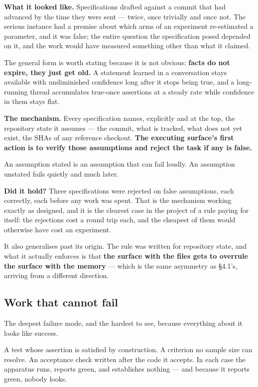 \textbf{What it looked like.} Specifications drafted against a commit that had advanced by the time they were sent --- twice, once trivially and once not. The serious instance had a premise about which arms of an experiment re-estimated a parameter, and it was false; the entire question the specification posed depended on it, and the work would have measured something other than what it claimed.

The general form is worth stating because it is not obvious: \textbf{facts do not expire, they just get old.} A statement learned in a conversation stays available with undiminished confidence long after it stops being true, and a long-running thread accumulates true-once assertions at a steady rate while confidence in them stays flat.

\textbf{The mechanism.} Every specification names, explicitly and at the top, the repository state it assumes --- the commit, what is tracked, what does not yet exist, the SHAs of any reference checkout. \textbf{The executing surface's first action is to verify those assumptions and reject the task if any is false.}

An assumption stated is an assumption that can fail loudly. An assumption unstated fails quietly and much later.

\textbf{Did it hold?} Three specifications were rejected on false assumptions, each correctly, each before any work was spent. That is the mechanism working exactly as designed, and it is the clearest case in the project of a rule paying for itself: the rejections cost a round trip each, and the cheapest of them would otherwise have cost an experiment.

It also generalises past its origin. The rule was written for repository state, and what it actually enforces is that \textbf{the surface with the files gets to overrule the surface with the memory} --- which is the same asymmetry as \S4.1's, arriving from a different direction.

\subsection{Work that cannot fail}

The deepest failure mode, and the hardest to see, because everything about it looks like success.

A test whose assertion is satisfied by construction. A criterion no sample size can resolve. An acceptance check written after the code it accepts. In each case the apparatus runs, reports green, and establishes nothing --- and because it reports green, nobody looks.

